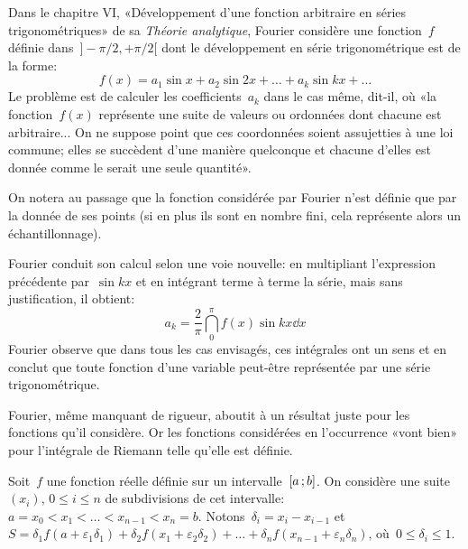 \medskip
\begin{histoire}%
Dans le chapitre VI, «Développement d'une fonction arbitraire en séries
trigonométriques» de sa \emph{Théorie analytique}, Fourier
considère une fonction~$f$
définie dans~$]-\pi/2,+\pi/2[$ dont le développement en série trigonométrique est
de la forme:
\begin{equation} f(x)=a_1\sin x+a_2\sin 2x +\ldots+a_k\sin kx +\ldots\end{equation}
Le problème est de calculer les coefficients~$a_k$ dans le cas même, dit-il, où «la
fonction~$f(x)$ représente une suite de valeurs ou ordonnées dont chacune est
arbitraire... On ne suppose point que ces coordonnées soient assujetties à une
loi commune; elles se succèdent d'une manière quelconque et chacune d'elles
est donnée comme le serait une seule quantité».

On notera au passage que la fonction considérée par Fourier
n'est définie que par la donnée de ses points (si en plus ils sont en nombre fini, cela représente alors
un échantillonnage).

\medskip
Fourier
conduit son calcul selon une voie nouvelle: en multipliant l'expression précédente
par~$\sin kx$ et en intégrant terme à terme la série, mais sans justification, il obtient:
\begin{equation}a_k=\frac2{\pi}\dint_0^{\pi} f(x)\sin kx \dd x\end{equation}
Fourier
observe que dans tous les cas envisagés, ces intégrales ont un sens et en conclut
que toute fonction d'une variable peut-être représentée par une série trigonométrique.

Fourier,
même manquant de rigueur, aboutit à un résultat juste pour les fonctions
qu'il considère.
Or les fonctions considérées en l'occurrence «vont bien» pour l'intégrale de Riemann
telle qu'elle est définie.

\medskip
{}
\begin{definition}
Soit~$f$ une fonction réelle définie sur un intervalle~$\mathopen{[}a\,;b\mathclose{]}$.
On considère une suite~$(x_i)$, $0\le i\le n$ de subdivisions de cet intervalle:
$a=x_0 < x_1 <\ldots < x_{n-1} <x_n=b$.
Notons~$\delta_i=x_i-x_{i-1}$ et~$S=\delta_1f(a+\varepsilon_1\delta_1) +
\delta_2 f(x_1+\varepsilon_2\delta_2)+ \ldots + \delta_nf(x_{n-1}+\varepsilon_n\delta_n)$,
où~$0\le \delta_i\le 1$.


\end{definition}
\end{histoire}
